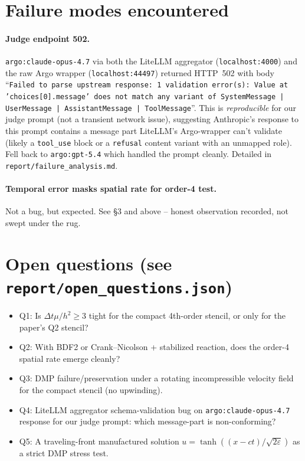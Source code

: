 \documentclass[11pt]{article}
\begin{document}
\section{Failure modes encountered}

\paragraph{Judge endpoint 502.}
\texttt{argo:claude-opus-4.7} via both the LiteLLM aggregator
(\texttt{localhost:4000}) and the raw Argo wrapper
(\texttt{localhost:44497}) returned HTTP~502 with body
``\texttt{Failed to parse upstream response: 1 validation error(s): Value
at 'choices[0].message' does not match any variant of SystemMessage |
UserMessage | AssistantMessage | ToolMessage}''.  This is
\emph{reproducible} for our judge prompt (not a transient network
issue), suggesting Anthropic's response to this prompt contains a
message part LiteLLM's Argo-wrapper can't validate (likely a
\texttt{tool\_use} block or a \texttt{refusal} content variant with an
unmapped role).  Fell back to \texttt{argo:gpt-5.4} which handled the
prompt cleanly.  Detailed in \texttt{report/failure\_analysis.md}.

\paragraph{Temporal error masks spatial rate for order-4 test.}
Not a bug, but expected. See \S 3 and above -- honest observation
recorded, not swept under the rug.

\section{Open questions (see \texttt{report/open\_questions.json})}
\begin{itemize}
  \item Q1: Is $\Delta t \mu/h^2 \ge 3$ tight for the compact 4th-order
    stencil, or only for the paper's Q2 stencil?
  \item Q2: With BDF2 or Crank--Nicolson + stabilized reaction, does the
    order-4 spatial rate emerge cleanly?
  \item Q3: DMP failure/preservation under a rotating incompressible
    velocity field for the compact stencil (no upwinding).
  \item Q4: LiteLLM aggregator schema-validation bug on
    \texttt{argo:claude-opus-4.7} response for our judge prompt: which
    message-part is non-conforming?
  \item Q5: A traveling-front manufactured solution
    $u = \tanh((x-ct)/\sqrt{2\varepsilon})$ as a strict DMP stress test.
\end{itemize}
\end{document}
